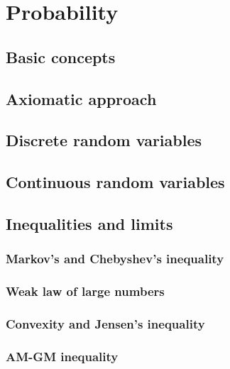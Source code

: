 \documentclass[main.tex]{subfiles}
\begin{document}
	\chapter{Probability}
		\section{Basic concepts}
		
		\section{Axiomatic approach}
		
		\section{Discrete random variables}
		
		\section{Continuous random variables}
		
		\section{Inequalities and limits}
			\subsection{Markov's and Chebyshev's inequality}
			
			\subsection{Weak law of large numbers}
			
			\subsection{Convexity and Jensen's inequality}
			
			\subsection{AM-GM inequality}
			
\end{document}
